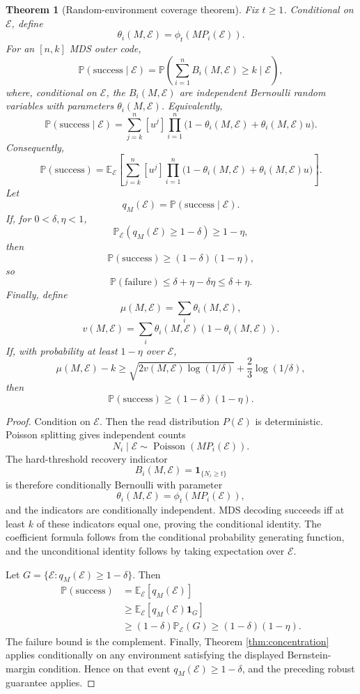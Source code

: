 \documentclass[11pt]{article}
\newtheorem{theorem}{Theorem}
\theoremstyle{definition}
\theoremstyle{remark}
\DeclareMathOperator{\Poisson}{Poisson}
\newcommand{\E}{\mathbb E}
\newcommand{\Pbb}{\mathbb P}
\newcommand{\1}{\mathbf 1}
\begin{document}
\begin{theorem}[Random-environment coverage theorem]\label{thm:random-environment}
Fix \(t\ge1\).  Conditional on \(\mathcal E\), define
\[
  \theta_i(M,\mathcal E)=\phi_t(MP_i(\mathcal E)).
\]
For an \([n,k]\) MDS outer code,
\[
  \Pbb(\mathrm{success}\mid \mathcal E)
  =\Pbb\left(\sum_{i=1}^n B_i(M,\mathcal E)\ge k\mid\mathcal E\right),
\]
where, conditional on \(\mathcal E\), the \(B_i(M,\mathcal E)\) are independent Bernoulli random variables with parameters \(\theta_i(M,\mathcal E)\).  Equivalently,
\[
  \Pbb(\mathrm{success}\mid \mathcal E)
  =\sum_{j=k}^n [u^j]\prod_{i=1}^n
  \bigl(1-\theta_i(M,\mathcal E)+\theta_i(M,\mathcal E)u\bigr).
\]
Consequently,
\[
  \Pbb(\mathrm{success})
  =\E_{\mathcal E}\left[
  \sum_{j=k}^n [u^j]\prod_{i=1}^n
  \bigl(1-\theta_i(M,\mathcal E)+\theta_i(M,\mathcal E)u\bigr)
  \right].
\]
Let
\[
  q_M(\mathcal E)=\Pbb(\mathrm{success}\mid\mathcal E).
\]
If, for \(0<\delta,\eta<1\),
\[
  \Pbb_{\mathcal E}(q_M(\mathcal E)\ge1-\delta)
  \ge1-\eta,
\]
then
\[
  \Pbb(\mathrm{success})\ge(1-\delta)(1-\eta),
\]
so
\[
  \Pbb(\mathrm{failure})\le \delta+
  \eta-\delta\eta\le\delta+
  \eta.
\]
Finally, define
\[
  \mu(M,\mathcal E)=\sum_i\theta_i(M,\mathcal E),
\]
\[
  v(M,\mathcal E)=\sum_i\theta_i(M,\mathcal E)(1-\theta_i(M,\mathcal E)).
\]
If, with probability at least \(1-\eta\) over \(\mathcal E\),
\[
  \mu(M,\mathcal E)-k
  \ge
  \sqrt{2v(M,\mathcal E)\log(1/\delta)}
  +\frac23\log(1/\delta),
\]
then
\[
  \Pbb(\mathrm{success})\ge(1-\delta)(1-\eta).
\]
\end{theorem}

\begin{proof}
Condition on \(\mathcal E\).  Then the read distribution \(P(\mathcal E)\) is deterministic.  Poisson splitting gives independent counts
\[
  N_i\mid\mathcal E\sim\Poisson(MP_i(\mathcal E)).
\]
The hard-threshold recovery indicator
\[
  B_i(M,\mathcal E)=\1_{\{N_i\ge t\}}
\]
is therefore conditionally Bernoulli with parameter
\[
  \theta_i(M,\mathcal E)=\phi_t(MP_i(\mathcal E)),
\]
and the indicators are conditionally independent.  MDS decoding succeeds iff at least \(k\) of these indicators equal one, proving the conditional identity.  The coefficient formula follows from the conditional probability generating function, and the unconditional identity follows by taking expectation over \(\mathcal E\).

Let \(G=\{\mathcal E:q_M(\mathcal E)\ge1-\delta\}\).  Then
\[
\begin{aligned}
  \Pbb(\mathrm{success})
  &=\E_{\mathcal E}[q_M(\mathcal E)] \\
  &\ge \E_{\mathcal E}[q_M(\mathcal E)\1_G] \\
  &\ge (1-\delta)\Pbb_{\mathcal E}(G)
  \ge(1-\delta)(1-\eta).
\end{aligned}
\]
The failure bound is the complement.  Finally, Theorem \ref{thm:concentration} applies conditionally on any environment satisfying the displayed Bernstein-margin condition.  Hence on that event \(q_M(\mathcal E)\ge1-\delta\), and the preceding robust guarantee applies.
\end{proof}
\end{document}
